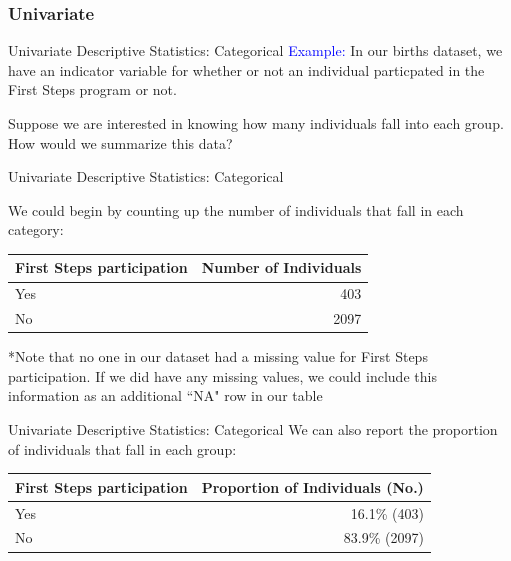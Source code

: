 \documentclass[10pt,t]{beamer}
\begin{document}
\subsubsection{Univariate}

\begin{frame}{Univariate Descriptive Statistics: Categorical}
\textcolor{blue}{Example:} In our births dataset, we have an indicator variable for whether or not an individual particpated in the First Steps program or not.

\vspace{0.3cm}

Suppose we are interested in knowing how many individuals fall into each group. How would we summarize this data?

\end{frame}

\begin{frame}{Univariate Descriptive Statistics: Categorical}

We could begin by counting up the number of individuals that fall in each category:

\vspace{0.3cm}

\begin{table}
	\centering
	\begin{tabular}{l|r}
		\textbf{First Steps participation} & \textbf{Number of Individuals} \\
		\hline
		Yes & 403\\
		\hline
		No & 2097
	\end{tabular}
\end{table}


\vspace{0.3cm}

*Note that no one in our dataset had a missing value for First Steps participation. If we did have any missing values, we could include this information as an additional ``NA" row in our table

\end{frame}

\begin{frame}{Univariate Descriptive Statistics: Categorical}
We can also report the proportion of individuals that fall in each group:

\vspace{0.3cm}

\begin{table}
	\centering
	\begin{tabular}{l|r}
		\textbf{First Steps participation} & \textbf{Proportion of Individuals (No.)} \\
		\hline
		Yes & 16.1\% (403)\\
		\hline
		No & 83.9\% (2097)
	\end{tabular}
\end{table}

\end{frame}
\end{document}
